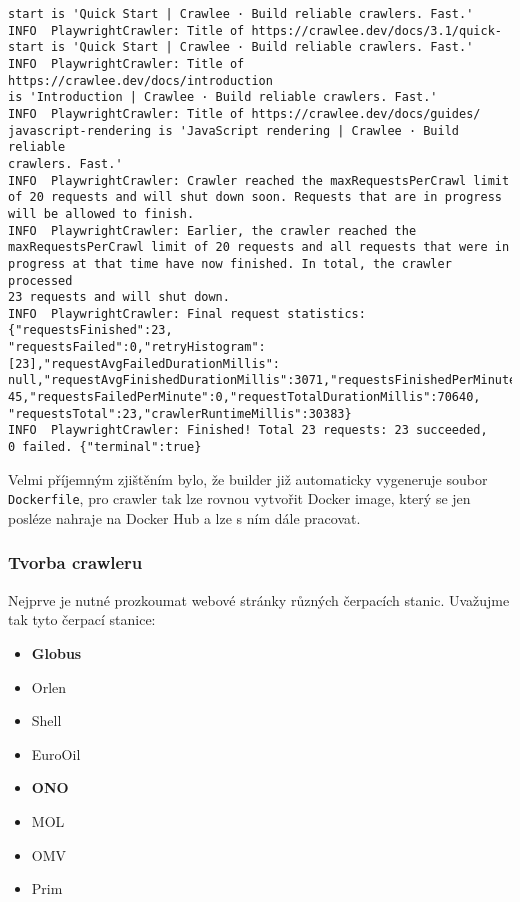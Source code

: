 \begin{verbatim}
start is 'Quick Start | Crawlee · Build reliable crawlers. Fast.'
INFO  PlaywrightCrawler: Title of https://crawlee.dev/docs/3.1/quick-
start is 'Quick Start | Crawlee · Build reliable crawlers. Fast.'
INFO  PlaywrightCrawler: Title of https://crawlee.dev/docs/introduction
is 'Introduction | Crawlee · Build reliable crawlers. Fast.'
INFO  PlaywrightCrawler: Title of https://crawlee.dev/docs/guides/
javascript-rendering is 'JavaScript rendering | Crawlee · Build reliable
crawlers. Fast.'
INFO  PlaywrightCrawler: Crawler reached the maxRequestsPerCrawl limit
of 20 requests and will shut down soon. Requests that are in progress
will be allowed to finish.
INFO  PlaywrightCrawler: Earlier, the crawler reached the
maxRequestsPerCrawl limit of 20 requests and all requests that were in
progress at that time have now finished. In total, the crawler processed
23 requests and will shut down.
INFO  PlaywrightCrawler: Final request statistics: {"requestsFinished":23,
"requestsFailed":0,"retryHistogram":[23],"requestAvgFailedDurationMillis":
null,"requestAvgFinishedDurationMillis":3071,"requestsFinishedPerMinute":
45,"requestsFailedPerMinute":0,"requestTotalDurationMillis":70640,
"requestsTotal":23,"crawlerRuntimeMillis":30383}
INFO  PlaywrightCrawler: Finished! Total 23 requests: 23 succeeded,
0 failed. {"terminal":true}
\end{verbatim}

Velmi příjemným zjištěním bylo, že builder již automaticky vygeneruje
soubor \texttt{Dockerfile}, pro crawler tak lze rovnou vytvořit
Docker image, který se jen posléze nahraje na Docker Hub a lze s ním
dále pracovat.

\subsubsection{Tvorba crawleru}

Nejprve je nutné prozkoumat webové stránky různých čerpacích stanic.
Uvažujme tak tyto čerpací stanice:

\begin{itemize}
    \item \textbf{Globus}
    \item Orlen
    \item Shell
    \item EuroOil
    \item \textbf{ONO}
    \item MOL
    \item OMV
    \item Prim
\end{itemize}

